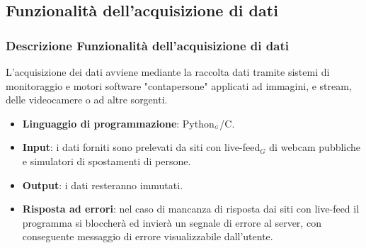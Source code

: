 \subsection{Funzionalità dell'acquisizione di dati}\label{}
\subsubsection{Descrizione Funzionalità dell'acquisizione di dati}\label{}
L'acquisizione dei dati avviene mediante la raccolta dati tramite sistemi di monitoraggio e motori software "contapersone" applicati ad immagini, e stream, delle videocamere o ad altre sorgenti.
\begin{itemize}
\item \textbf{Linguaggio di programmazione}: Python$_{\scaleto{G}{3pt}}$/C.
\item \textbf{Input}: i dati forniti sono prelevati da siti con live-feed$_G$ di webcam pubbliche e simulatori di spostamenti di persone.
\item \textbf{Output}: i dati resteranno immutati.
\item \textbf{Risposta ad errori}: nel caso di mancanza di risposta dai siti con live-feed il programma si bloccherà ed invierà un segnale di errore al server, con conseguente messaggio di errore visualizzabile dall'utente.
\end{itemize}

